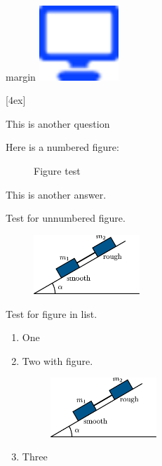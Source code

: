 \documentclass[solutionsatend,twocolumnsolutions]{ouunit}
\begin{document}
\lipsum[134]
\begin{marginfigure*}
\fboxsep 0pt%
\begin{outikzfig}[figurebox]{margin}
\includegraphics[width=3cm]{icon}
\end{outikzfig}
\end{marginfigure*}
[4ex]

\lipsum[133]

\begin{exercise}\label{exe-fig-test}
This is another question
\begin{solution}
Here is a numbered figure:
\begin{figure}
\caption{Figure test \label{fig-placement-test}}
\end{figure}
This is another answer.
\end{solution}
\end{exercise}

Test for unnumbered figure.

\begin{figure}
\includegraphics[width=4cm]{test}
\end{figure}

Test for figure in list.
\begin{enumerate}
\item
One
\item
Two with figure.
\begin{figure}
\includegraphics[width=4cm]{test}
\end{figure}
\item
Three
\end{enumerate}
\end{document}

